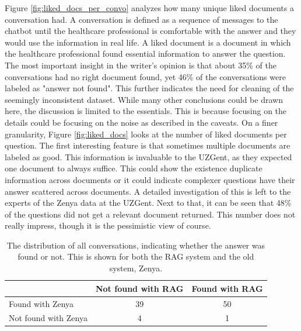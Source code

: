 Figure \ref{fig:liked_docs_per_convo} analyzes how many unique liked documents a conversation had. A conversation is defined as a sequence of messages to the chatbot until the healthcare professional is comfortable with the answer and they would use the information in real life. A liked document is a document in which the healthcare professional found essential information to answer the question. The most important insight in the writer's opinion is that about 35\% of the conversations had no right document found, yet 46\% of the conversations were labeled as "answer not found". This further indicates the need for cleaning of the seemingly inconsistent dataset. While many other conclusions could be drawn here, the discussion is limited to the essentials. This is because focusing on the details could be focusing on the noise as described in the caveats. On a finer granularity, Figure \ref{fig:liked_docs} looks at the number of liked documents per question. The first interesting feature is that sometimes multiple documents are labeled as good. This information is invaluable to the UZGent, as they expected one document to always suffice. This could show the existence duplicate information across documents or it could indicate complexer questions have their answer scattered across documents. A detailed investigation of this is left to the experts of the Zenya data at the UZGent. Next to that, it can be seen that 48\% of the questions did not get a relevant document returned. This number does not really impress, though it is the pessimistic view of course.

\begin{table}[H]
    \centering
    \begin{tabular}{l|cc}
     & Not found with RAG & Found with RAG \\
    \hline
    Found with Zenya  & 39 & 50 \\
    Not found with Zenya & 4  & 1  \\
    \end{tabular}
    \caption{The distribution of all conversations, indicating whether the answer was found or not. This is shown for both the RAG system and the old system, Zenya.}
    \label{tab:found_rate}
\end{table}

